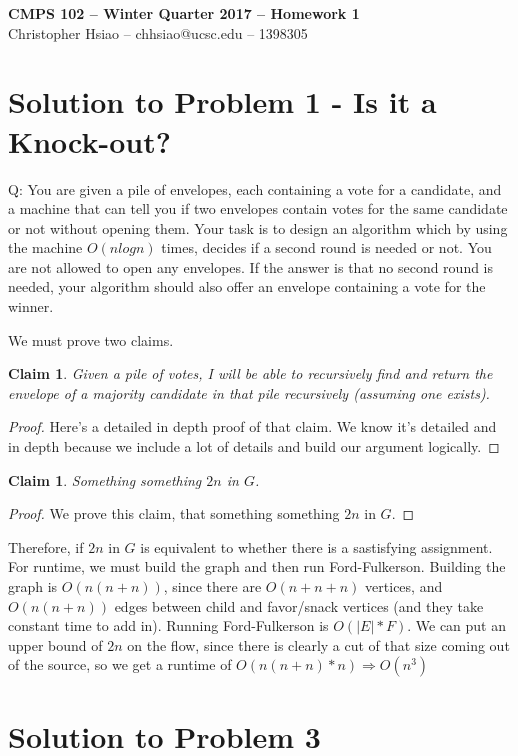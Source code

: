 \documentclass[11pt]{article}
\newtheorem{claim}[theorem]{Claim}
\begin{document}
\begin{center}
{\bf\Large CMPS 102 -- Winter Quarter 2017 --  Homework 1}\\
Christopher Hsiao -- chhsiao@ucsc.edu -- 1398305
\end{center}

\section*{Solution to Problem 1 - Is it a Knock-out?}
Q: 
You are given a pile of envelopes, each containing a vote for a candidate, and a machine that can tell you if two envelopes contain votes for the same candidate or not without opening them. Your task is to design an algorithm which by using the machine $O(nlogn)$ times, decides if a second round is needed or not. You are not allowed to open any envelopes. If the answer is that no second round is needed, your algorithm should also offer an envelope containing a vote for the winner.

We must prove two claims.
\begin{claim} 
Given a pile of votes, I will be able to recursively find and return the envelope of a majority candidate in that pile recursively (assuming one exists).
\end{claim}
\begin{proof}
Here's a detailed in depth proof of that claim. We know it's detailed and in depth because we include a lot of details and build our argument logically.
\end{proof}

\begin{claim} 
Something something $2n$ in $G$. 
\end{claim}
\begin{proof}
We prove this claim, that something something $2n$ in $G$.
\end{proof}
Therefore, if $2n$ in $G$ is equivalent to whether there is a sastisfying assignment. For runtime, we must build the graph and then run Ford-Fulkerson. Building the graph is $O(n(n+n))$, since there are $O(n+n+n)$ vertices, and $O(n(n+n))$ edges between child and favor/snack vertices (and they take constant time to add in). Running Ford-Fulkerson is $O(|E|*F)$. We can put an upper bound of $2n$ on the flow, since there is clearly a cut of that size coming out of the source, so we get a runtime of $O(n(n+n) * n) \Rightarrow O(n^{3})$

\newpage

\section*{Solution to Problem 3}
\end{document}
